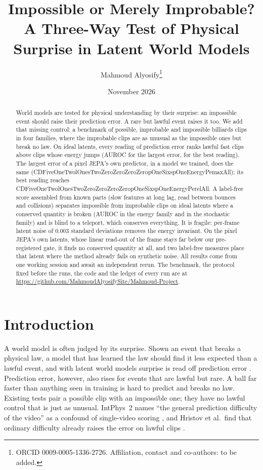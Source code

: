 \documentclass[11pt]{article}
\title{Impossible or Merely Improbable?\\
A Three-Way Test of Physical Surprise in Latent World Models}
\author{Mahmoud Alyosify\thanks{ORCID 0009-0005-1336-2726. Affiliation, contact and co-authors: to be added.}}
\date{November 2026}
\newcommand{\Cp}[1]{\csname CDFiveOneTwolOnesTwoZeroZeroZeroZeropOneSixspOne#1\endcsname}
\begin{document}
\maketitle

\begin{abstract}
World models are tested for physical understanding by their surprise: an impossible event should
raise their prediction error. A rare but lawful event raises it too. We add that missing control:
a benchmark of possible, improbable and impossible billiards clips in four families, where the
improbable clips are as unusual as the impossible ones but break no law. On ideal latents, every
reading of prediction error ranks lawful fast clips above clips whose energy jumps (AUROC
\AEnergyPemax{} for the largest error, \AEnergyPerel{} for the best reading). The largest error of a
pixel JEPA's own predictor, in a model we trained, does the same (\Cp{EnergyPemaxAll}); its best
reading reaches \Cp{EnergyPerelAll}. A
label-free score assembled from known parts (slow features at long lag, read between bounces and
collisions) separates impossible from improbable clips on ideal latents where a conserved quantity is
broken (AUROC \AEnergyInv{} in the energy family and \AStochasticInv{} in the stochastic family) and is
blind to a teleport, which conserves everything.
It is fragile: per-frame latent noise of 0.003 standard deviations removes the energy invariant. On the
pixel JEPA's own latents, whose linear read-out of the frame stays far below our pre-registered
gate, it finds no conserved quantity at all, and two label-free measures place that latent where the
method already fails on synthetic noise. All results come from one working session and await an
independent rerun. The benchmark, the protocol fixed before the runs, the code and the ledger of every
run are at \url{https://github.com/MahmoudAlyosifySite/Mahmoud-Project}.
\end{abstract}

\section{Introduction}

A world model is often judged by its surprise. Shown an event that breaks a physical law, a model
that has learned the law should find it less expected than a lawful event, and with latent world
models surprise is read off prediction error
\citep{maes2026lewm,bordes2025intphys2,hristov2026surprise}. Prediction error, however, also rises
for events that are lawful but rare. A ball far faster than anything seen in training is hard to
predict and breaks no law. Existing tests pair a possible clip with an impossible one; they have no
lawful control that is just as unusual. IntPhys~2 names ``the general prediction difficulty of the
video'' as a confound of single-video scoring \citep{bordes2025intphys2}, and Hristov et al.\ find
that ordinary difficulty already raises the error on lawful clips \citep{hristov2026surprise}.
\end{document}
